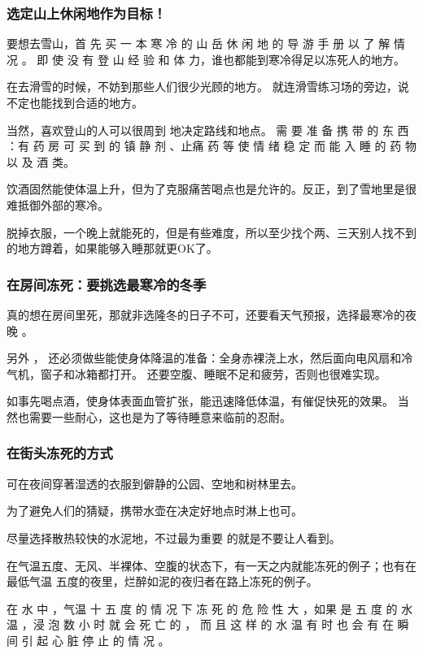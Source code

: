 \documentclass[UTF8]{ctexart}
\begin{document}
\subsubsection*{选定山上休闲地作为目标！}

要想去雪山，首 先 买 一 本 寒 冷 的 山 岳 休 闲 地 的 导 游 手 册 以 了 解 情 况 。
即 使 没 有 登 山 经 验 和 体 力，谁也都能到寒冷得足以冻死人的地方。

在去滑雪的时候，不妨到那些人们很少光顾的地方。
就连滑雪练习场的旁边，说不定也能找到合适的地方。

当然，喜欢登山的人可以很周到 地决定路线和地点。 
需 要 准 备 携 带 的 东 西 ：有 药 房 可 买 到 的 镇 静 剂 、止痛 药 等 使 情 绪 稳 定 而 能 入 睡 的 药 物 以 及 酒 类。

饮酒固然能使体温上升，但为了克服痛苦喝点也是允许的。反正，到了雪地里是很难抵御外部的寒冷。

脱掉衣服，一个晚上就能死的，但是有些难度，所以至少找个两、三天别人找不到的地方蹲着，如果能够入睡那就更OK了。

\subsubsection*{在房间冻死：要挑选最寒冷的冬季}

真的想在房间里死，那就非选隆冬的日子不可，还要看天气预报，选择最寒冷的夜晚 。

另外 ， 还必须做些能使身体降温的准备：全身赤裸浇上水，然后面向电风扇和冷气机，窗子和冰箱都打开。
还要空腹、睡眠不足和疲劳，否则也很难实现。

如事先喝点酒，使身体表面血管扩张，能迅速降低体温，有催促快死的效果。
当然也需要一些耐心，这也是为了等待睡意来临前的忍耐。


\subsubsection*{在街头冻死的方式}

可在夜间穿著湿透的衣服到僻静的公园、空地和树林里去。

为了避免人们的猜疑，携带水壶在决定好地点时淋上也可。

尽量选择散热较快的水泥地，不过最为重要 的就是不要让人看到。 

在气温五度、无风、半裸体、空腹的状态下，有一天之内就能冻死的例子；也有在最低气温 五度的夜里，烂醉如泥的夜归者在路上冻死的例子。

在 水 中 ，气温 十 五 度 的 情 况 下 冻 死 的 危 险 性 大 ，如果 是 五 度 的 水 温 ，浸 泡 数 小 时 就 会 死 亡 的 ， 而 且 这 样 的 水 温 有 时 也 会 有 在 瞬 间 引 起 心 脏 停 止 的 情 况 。
\end{document}
